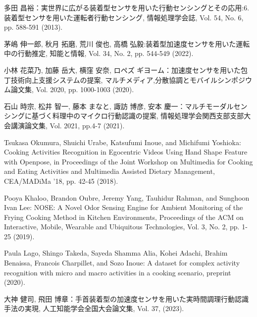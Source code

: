 \begin{thebibliography}{参考文献}
	多田 昌裕：実世界に広がる装着型センサを用いた行動センシングとその応用:6. 装着型センサを用いた運転者行動センシング, 情報処理学会誌, Vol. 54, No. 6, pp. 588-591 (2013).

	茅嶋 伸一郎, 秋月 拓磨, 荒川 俊也, 高橋 弘毅:装着型加速度センサを用いた運転中の行動推定, 知能と情報, Vol. 34, No. 2, pp. 544-549 (2022).


	小林 花菜乃, 加藤 岳大, 横窪 安奈, ロペズ ギヨーム：加速度センサを用いた包丁技術向上支援システムの提案, マルチメディア,分散協調とモバイルシンポジウム論文集, Vol. 2020, pp. 1000-1003 (2020).
	
	石山 時宗, 松井 智一, 藤本 まなと, 諏訪 博彦, 安本 慶一：マルチモーダルセンシングに基づく料理中のマイクロ行動認識の提案, 情報処理学会関西支部支部大会講演論文集, Vol. 2021, pp.4-7 (2021).

	Tsukasa Okumura, Shuichi Urabe, Katsufumi Inoue, and Michifumi Yoshioka: Cooking Activities Recognition in Egocentric Videos Using Hand Shape Feature with Openpose, in Proceedings of the Joint Workshop on Multimedia for Cooking and Eating Activities and Multimedia Assisted Dietary Management, CEA/MADiMa '18, pp. 42-45 (2018).

	Pooya Khaloo, Brandon Oubre, Jeremy Yang, Tauhidur Rahman, and Sunghoon Ivan Lee: NOSE: A Novel Odor Sensing Engine for Ambient Monitoring of the Frying Cooking Method in Kitchen Environments, Proceedings of the ACM on Interactive, Mobile, Wearable and Ubiquitous Technologies, Vol. 3, No. 2, pp. 1-25 (2019).

	Paula Lago, Shingo Takeda, Sayeda Shamma Alia, Kohei Adachi, Brahim Benaissa, Francois Charpillet, and Sozo Inoue: A dataset for complex activity recognition with micro and macro activities in a cooking scenario, preprint (2020).

	大神 健司, 飛田 博章：手首装着型の加速度センサを用いた実時間調理行動認識手法の実現, 人工知能学会全国大会論文集, Vol. 37, (2023).


\end{thebibliography}

